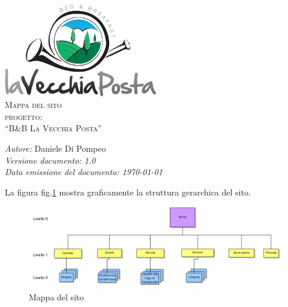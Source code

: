 \documentclass[a4paper,12pt,hidelinks]{report}
\begin{document}
  \begin{titlepage}
    \begin{center}
      \includegraphics[width=0.5\textwidth,keepaspectratio=true]{../img/logo}\\[1cm]    
      \textsc{\LARGE Mappa del sito}\\[0.6cm]
      \textsc{\LARGE  progetto:\\[0.5cm] ``B\&B La Vecchia Posta''}\\ [2.0cm]

      \begin{minipage}{0.8\textwidth}
	\begin{flushleft} \large
	  \emph{Autore:} Daniele Di Pompeo \\[0.5cm]
	  \emph{Versione documento: 1.0}\\[0.5cm]
	  \emph{Data emissione del documento: \today}\\[0.5cm]
	\end{flushleft}
      \end{minipage}
    \end{center}
  \end{titlepage}

La figura fig.\ref{fig:sitemap} mostra graficamente la struttura gerarchica del sito. 
\begin{figure}[h!]%
    \includegraphics[width=1\textwidth,keepaspectratio=true]{../img/sitemap}
    \centering
    \caption{Mappa del sito}%
    \label{fig:sitemap}%
\end{figure}
\end{document}
